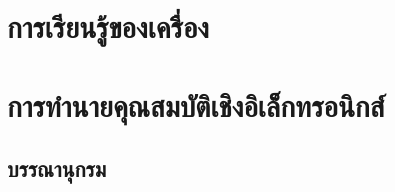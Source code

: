 \part{การเรียนรู้ของเครื่อง}






\part{การทำนายคุณสมบัติเชิงอิเล็กทรอนิกส์}







\begin{appendices}


\end{appendices}

\backmatter

\chapter*{บรรณานุกรม}

\printbibliography[heading=none]

\printindex[th]
\printindex[en]




